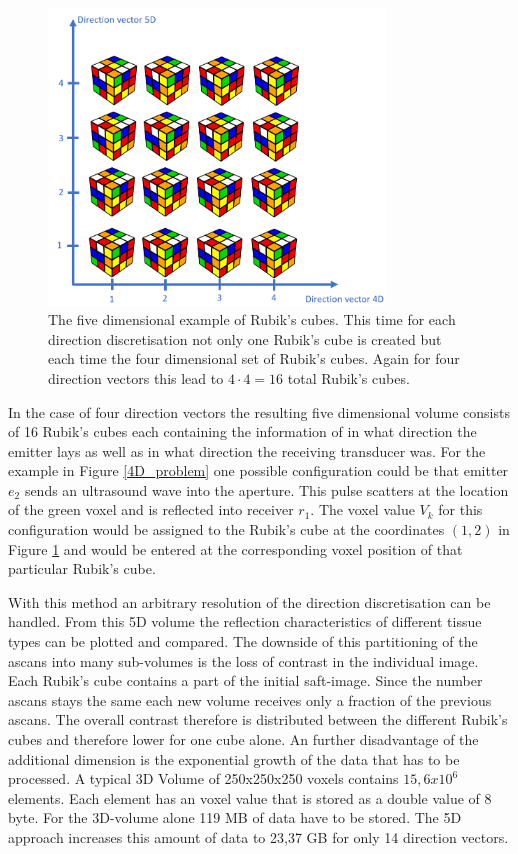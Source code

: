 \begin{figure}[H]
    \centering
    \includegraphics[width=0.8\textwidth]{Graphics/rubicscube5D.png}
    \caption{The five dimensional example of Rubik's cubes. This time for each direction discretisation not only one Rubik's cube is created but each time the four dimensional set of Rubik's cubes. Again for four direction vectors this lead to $4\cdot 4=16$ total Rubik's cubes.
    }
    \label{5D_rubics}
\end{figure}

In the case of four direction vectors the resulting five dimensional volume consists of 16 Rubik's cubes each containing the information of in what direction the emitter lays as well as in what direction the receiving transducer was. For the example in Figure \ref{4D_problem} one possible configuration could be that emitter $e_2$ sends an ultrasound wave into the aperture. This pulse scatters at the location of the green voxel and is reflected into receiver $r_1$. The voxel value $V_k$ for this configuration would be assigned to the Rubik's cube at the coordinates $(1,2)$ in Figure \ref{5D_rubics} and would be entered at the corresponding voxel position of that particular Rubik's cube.

With this method an arbitrary resolution of the direction discretisation can be handled. From this 5D volume the reflection characteristics of different tissue types can be plotted and compared. The downside of this partitioning of the \acp{ascan} into many sub-volumes is the loss of contrast in the individual image. Each Rubik's cube contains a part of the initial \ac{saft}-image. Since the number \acp{ascan} stays the same each new volume receives only a fraction of the previous \acp{ascan}. The overall contrast therefore is distributed between the different Rubik's cubes and therefore lower for one cube alone. An further disadvantage of the additional dimension is the exponential growth of the data that has to be processed. A typical 3D Volume of 250x250x250 voxels contains $15,6x10^6$ elements. Each element has an voxel value that is stored as a double value of 8 byte. For the 3D-volume alone 119 MB of data have to be stored. The 5D approach increases this amount of data to 23,37 GB for only 14 direction vectors.   



